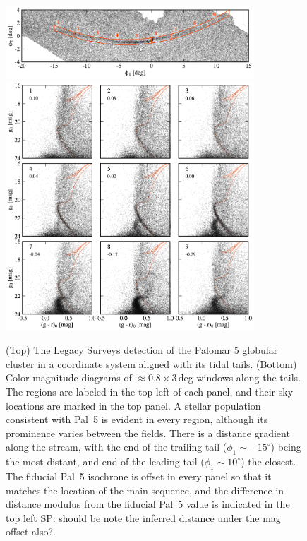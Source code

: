 \documentclass[twocolumn]{aastex62}
\newcommand{\sa}[1]{{\color{magenta} SP: #1}}
\begin{document}
\begin{figure}
\begin{center}
\includegraphics[width=0.83\textwidth]{fig1_a_map.pdf}
\includegraphics[width=0.83\textwidth]{fig1_b_cmds.pdf}
\end{center}
\caption{
(Top) The Legacy Surveys detection of the Palomar 5 globular cluster in a coordinate system aligned with its tidal tails.
(Bottom) Color-magnitude diagrams of $\approx0.8\times3$\,deg windows along the tails.
The regions are labeled in the top left of each panel, and their sky locations are marked in the top panel.
A stellar population consistent with Pal~5 is evident in every region, although its prominence varies between the fields.
There is a distance gradient along the stream, with the end of the trailing tail ($\phi_1\sim-15^\circ$) being the most distant, and end of the leading tail ($\phi_1\sim10^\circ$) the closest.
The fiducial Pal~5 isochrone is offset in every panel so that it matches the location of the main sequence, and the difference in distance modulus from the fiducial Pal~5 value is indicated in the top left \sa{should be note the inferred distance under the mag offset also?}.
}
\label{fig:cmds}
\end{figure}
\end{document}
